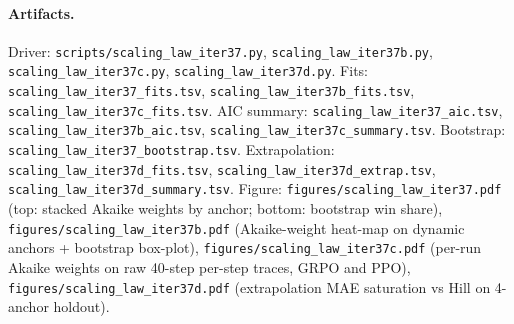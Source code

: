 \paragraph{Artifacts.}
Driver: \texttt{scripts/scaling\_law\_iter37.py},
\texttt{scaling\_law\_iter37b.py},
\texttt{scaling\_law\_iter37c.py},
\texttt{scaling\_law\_iter37d.py}.
Fits: \texttt{scaling\_law\_iter37\_fits.tsv},
\texttt{scaling\_law\_iter37b\_fits.tsv},
\texttt{scaling\_law\_iter37c\_fits.tsv}.
AIC summary: \texttt{scaling\_law\_iter37\_aic.tsv},
\texttt{scaling\_law\_iter37b\_aic.tsv},
\texttt{scaling\_law\_iter37c\_summary.tsv}.
Bootstrap: \texttt{scaling\_law\_iter37\_bootstrap.tsv}.
Extrapolation: \texttt{scaling\_law\_iter37d\_fits.tsv},
\texttt{scaling\_law\_iter37d\_extrap.tsv},
\texttt{scaling\_law\_iter37d\_summary.tsv}.
Figure: \texttt{figures/scaling\_law\_iter37.pdf} (top: stacked
Akaike weights by anchor; bottom: bootstrap win share),
\texttt{figures/scaling\_law\_iter37b.pdf} (Akaike-weight heat-map
on dynamic anchors + bootstrap box-plot),
\texttt{figures/scaling\_law\_iter37c.pdf} (per-run Akaike weights
on raw 40-step per-step traces, GRPO and PPO),
\texttt{figures/scaling\_law\_iter37d.pdf} (extrapolation MAE
saturation vs Hill on 4-anchor holdout).
